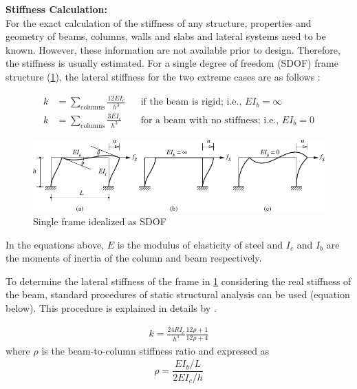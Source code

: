 \documentclass{simcenterdocumentation}
\newcommand{\kip}{\ensuremath{\,\mathrm{k}}}
\begin{document}

\vspace{10mm}
\noindent\textbf{Stiffness Calculation:}\\
\indent For the exact calculation of the stiffness of any structure, properties and geometry of beams, columns, walls and slabs and lateral systems need to be known. However, these information are not available prior to design. Therefore, the stiffness is usually estimated. For a single degree of freedom (SDOF) frame structure (\cref{fig:frame_sdof}), the lateral stiffness for the two extreme cases are as follows \cite{ChopraAnilK2012Dos}:

\begin{align*}
k &= \sum_\mathrm{columns} \frac{12 E I_c}{h^3}	&& \text{if the beam is rigid; i.e., } EI_b = \infty		\\
k &= \sum_\mathrm{columns} \frac{3 E I_c}{h^3}	&& \text{for a beam with no stiffness; i.e., } EI_b = 0
\end{align*}
\begin{figure}[H]
	\centering \includegraphics[width=0.9\linewidth]{frame_sdof.pdf}
	\caption{Single frame idealized as SDOF \cite{ChopraAnilK2012Dos}}
	\label{fig:frame_sdof}
\end{figure}

In the equations above, $E$ is the modulus of elasticity of steel and $I_c$ and $I_b$ are the moments of inertia of the column and beam respectively.

To determine the lateral stiffness of the frame in \cref{fig:frame_sdof} considering the real stiffness of the beam, standard procedures of static structural analysis can be used (equation below). This procedure is explained in details by \cite{ChopraAnilK2012Dos}.

\begin{gather*}
k = \frac{24 R I_c}{h^3} \frac{12 \rho + 1}{12 \rho + 4}
\end{gather*}
where $\rho$ is the beam-to-column stiffness ratio and expressed as 
\begin{gather*}
\rho = \dfrac{EI_b / L}{2 E I_c/h}
\end{gather*}
\end{document}
